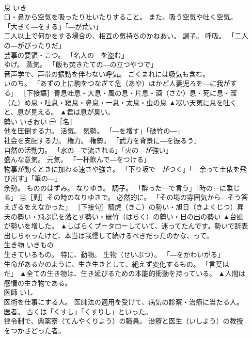 \documentclass[8pt]{extreport}
\begin{document}
\begin{CJK}{UTF8}{min}
\\	息	いき	
\\	口・鼻から空気を吸ったり吐いたりすること。 また、吸う空気や吐く空気。 「大きく―をする」「―が荒い」 
\\	二人以上で何かをする場合の、相互の気持ちのかねあい。 調子。 呼吸。 「二人の―がぴったりだ」 
\\	芸事の要領・こつ。 「名人の―を盗む」 
\\	ゆげ。 蒸気。 「飯も焚きたての―の立つやつで」 
\\	音声学で、声帯の振動を伴わない呼気。 ごくまれには吸気も含む。 
\\	いのち。 「あずの上に駒をつなぎて危（あや）ほかど人妻児ろを―に我がする」 ［下接語］青息吐息・大息・風の息・片息・酒（さか）息・死に息・溜（た）め息・吐息・寝息・鼻息・一息・太息・虫の息	▲寒い天気に息を吐くと、息が見える。 ▲君は息が臭い。
\\	勢い	いきおい	㊀［名］ 
\\	他を圧倒する力。 活気。 気勢。 「―を増す」「破竹の―」 
\\	社会を支配する力。 権力。 権勢。 「武力を背景に―を振るう」 
\\	自然の活動力。 「水の―で流される」「火の―が強い」 
\\	盛んな意気。 元気。 「一杯飲んで―をつける」 
\\	物事が動くときに加わる速さや強さ。 「下り坂で―がつく」「―余って土俵を飛び出す」「筆の―」 
\\	余勢。 もののはずみ。 なりゆき。 調子。 「酔った―で言う」「時の―に乗じる」 ㊁［副］その時のなりゆきで。 必然的に。 「その場の雰囲気から―そう答えざるをえなかった」 ［下接句］騎虎（きこ）の勢い・旭日（きよくじつ）昇天の勢い・飛ぶ鳥を落とす勢い・破竹（はちく）の勢い・日の出の勢い	▲台風が勢いを増した。 ▲しばらくプータローしていて、迷ってたんです。勢いで辞表出しちゃったけど、本当は我慢して続けるべきだったのかな、って。
\\	生き物	いきもの	
\\	生きているもの。 特に、動物。 生物（せいぶつ）。 「―をかわいがる」 
\\	生命があるかのように、生き生きとして、絶えず変化するもの。 「言葉は―だ」	▲全ての生き物は、生き延びるための本能的衝動を持っている。 ▲人間は感情の生き物である。
\\	医師	いし	
\\	医術を仕事にする人。 医師法の適用を受けて、病気の診察・治療に当たる人。 医者。 古くは「くすし」「くすりし」といった。 
\\	律令制で、典薬寮（てんやくりよう）の職員。 治療と医生（いしよう）の教授をつかさどった者。 

\end{CJK}
\end{document}
